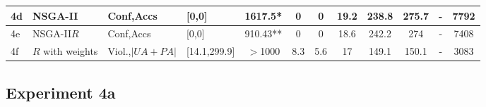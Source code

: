 \begin{table}[H]
\begin{adjustbox}{width=\textwidth}
\begin{tabular}{|l|l|l|l|c|c|c|c|c|c|c|c|}
				4d & NSGA-II & Conf,Accs &   [0,0] &   1617.5* &0   &   0 & 19.2   &   238.8   &   275.7   &   -    & 7792\\ \hline
				4e & NSGA-II$R$ & Conf,Accs   & [0,0] &   910.43** &   0   &   0 & 18.6   &   242.2   &   274   &   -    & 7408\\ \hline
				4f & $R$ with weights & Viol.,$|UA+PA|$ & [14.1,299.9] &   $>$1000 &   8.3   &   5.6 & 17   &   149.1   &   150.1   &   -    & 3083\\ \hline		
			\end{tabular}
		\end{adjustbox}
	\end{table}

	\subsection{Experiment 4a}
	\label{sec:A_Exp4a}
